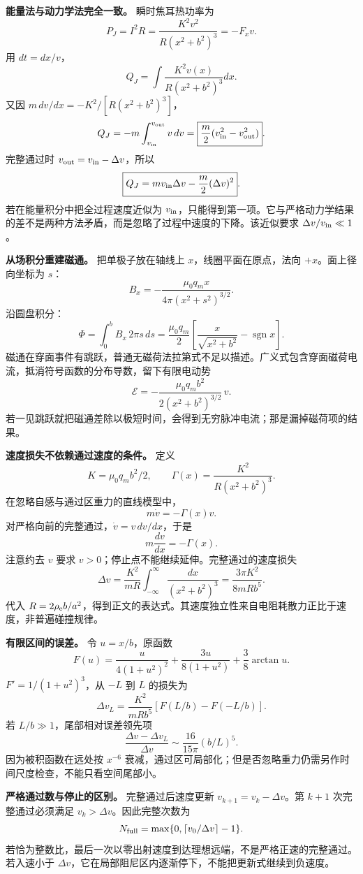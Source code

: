 \documentclass[12pt,a4paper,UTF8]{ctexart}
\begin{document}
\textbf{能量法与动力学法完全一致。} 瞬时焦耳热功率为 \[
P_J=I^2R=
\frac{K^2v^2}{R(x^2+b^2)^3}=-F_xv.
\] 用 \(dt=dx/v\)， \[
Q_J=\int\frac{K^2v(x)}{R(x^2+b^2)^3}dx.
\] 又因 \(m\,dv/dx=-K^2/[R(x^2+b^2)^3]\)， \[
Q_J=-m\int_{v_{\rm in}}^{v_{\rm out}}v\,dv
=\boxed{\frac m2(v_{\rm in}^2-v_{\rm out}^2)}.
\] 完整通过时 \(v_{\rm out}=v_{\rm in}-\Delta v\)，所以 \[
\boxed{Q_J=mv_{\rm in}\Delta v-\frac m2(\Delta v)^2}.
\] 若在能量积分中把全过程速度近似为
\(v_{\rm in}\)，只能得到第一项。它与严格动力学结果的差不是两种方法矛盾，而是忽略了过程中速度的下降。该近似要求
\(\Delta v/v_{\rm in}\ll1\)。

\textbf{从场积分重建磁通。} 把单极子放在轴线上
\(x\)，线圈平面在原点，法向 \(+x\)。面上径向坐标为 \(s\)： \[
B_x=-\frac{\mu_0q_m x}{4\pi(x^2+s^2)^{3/2}}.
\] 沿圆盘积分： \[
\Phi=\int_0^b B_x\,2\pi s\,ds
=\frac{\mu_0q_m}{2}
\left[\frac{x}{\sqrt{x^2+b^2}}-\operatorname{sgn}x\right].
\]
磁通在穿面事件有跳跃，普通无磁荷法拉第式不足以描述。广义式包含穿面磁荷电流，抵消符号函数的分布导数，留下有限电动势
\[
\mathcal E=-\frac{\mu_0q_m b^2}{2(x^2+b^2)^{3/2}}\,v.
\]
若一见跳跃就把磁通差除以极短时间，会得到无穷脉冲电流；那是漏掉磁荷项的结果。

\textbf{速度损失不依赖通过速度的条件。} 定义 \[
K=\mu_0q_m b^2/2,\qquad
\Gamma(x)=\frac{K^2}{R(x^2+b^2)^3}.
\] 在忽略自感与通过区重力的直线模型中， \[
m\dot v=-\Gamma(x)v.
\] 对严格向前的完整通过，\(\dot v=v\,dv/dx\)，于是 \[
m\frac{dv}{dx}=-\Gamma(x).
\] 注意约去 \(v\) 要求 \(v>0\)；停止点不能继续延伸。完整通过的速度损失
\[
\Delta v=\frac{K^2}{mR}\int_{-\infty}^{\infty}
\frac{dx}{(x^2+b^2)^3}
=\frac{3\pi K^2}{8mRb^5}.
\] 代入
\(R=2\rho_{\rm e}b/a^2\)，得到正文的表达式。其速度独立性来自电阻耗散力正比于速度，非普遍碰撞规律。

\textbf{有限区间的误差。} 令 \(u=x/b\)，原函数 \[
F(u)=\frac{u}{4(1+u^2)^2}
+\frac{3u}{8(1+u^2)}
+\frac38\arctan u.
\] \(F'=1/(1+u^2)^3\)，从 \(-L\) 到 \(L\) 的损失为 \[
\Delta v_L=\frac{K^2}{mRb^5}
[F(L/b)-F(-L/b)].
\] 若 \(L/b\gg1\)，尾部相对误差领先项 \[
\frac{\Delta v-\Delta v_L}{\Delta v}
\sim\frac{16}{15\pi}(b/L)^5.
\] 因为被积函数在远处按 \(x^{-6}\)
衰减，通过区可局部化；但是否忽略重力仍需另作时间尺度检查，不能只看空间尾部小。

\textbf{严格通过数与停止的区别。} 完整通过后速度更新
\(v_{k+1}=v_k-\Delta v\)。第 \(k+1\) 次完整通过必须满足
\(v_k>\Delta v\)。因此完整次数为 \[
N_{\rm full}=\max\{0,\lceil v_0/\Delta v\rceil-1\}.
\]
若恰为整数比，最后一次以零出射速度到达理想远端，不是严格正速的完整通过。若入速小于
\(\Delta v\)，它在局部阻尼区内逐渐停下，不能把更新式继续到负速度。
\end{document}
